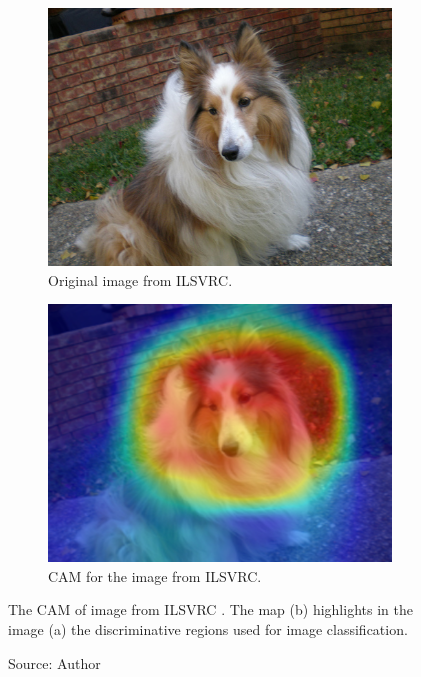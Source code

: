 \begin{figure}[h]
    \begin{center}
    \begin{subfigure}[b]{0.4\textwidth}
         \centering
         \includegraphics[width=\textwidth]{images/fig_ILSVRC2012_val_00000003.JPEG}
         \caption{Original image from ILSVRC.}
         \label{fig:ILSVRC2012_val_00000003}
    \end{subfigure}
    \begin{subfigure}[b]{0.4\textwidth}
         \centering
         \includegraphics[width=\textwidth]{images/fig_ILSVRC2012_val_00000003_cam_0.png}
         \caption{CAM for the image from ILSVRC.}
         \label{fig:ILSVRC2012_val_00000003_cam}
    \end{subfigure}
    \caption[The CAM of an image from ILSVRC \cite{russakovsky2015imagenet}]{The CAM of image from ILSVRC \cite{russakovsky2015imagenet}. The map (b) highlights in the image (a) the discriminative regions used for image classification.}
    \caption*{Source: Author}
    \label{fig:cam_discriminative_localization}
    \end{center}
\end{figure}

